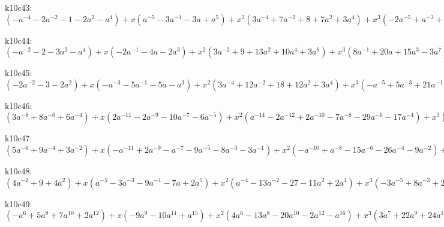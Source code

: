 k10c43: $ (-a^{-4}-2a^{-2}-1-2a^{2}-a^{4}) +x(a^{-5}-3a^{-1}-3a+a^{5}) +x^{2}(3a^{-4}+7a^{-2}+8+7a^{2}+3a^{4}) +x^{3}(-2a^{-5}+a^{-3}+12a^{-1}+12a+a^{3}-2a^{5}) +x^{4}(-6a^{-4}-8a^{-2}-4-8a^{2}-6a^{4}) +x^{5}(a^{-5}-6a^{-3}-16a^{-1}-16a-6a^{3}+a^{5}) +x^{6}(3a^{-4}-6+3a^{4}) +x^{7}(4a^{-3}+7a^{-1}+7a+4a^{3}) +x^{8}(3a^{-2}+6+3a^{2}) +x^{9}(a^{-1}+a) $

k10c44: $ (-a^{-2}-2-3a^{2}-a^{4}) +x(-2a^{-1}-4a-2a^{3}) +x^{2}(3a^{-2}+9+13a^{2}+10a^{4}+3a^{6}) +x^{3}(8a^{-1}+20a+15a^{3}-3a^{7}) +x^{4}(-3a^{-2}-6-12a^{2}-18a^{4}-8a^{6}+a^{8}) +x^{5}(-9a^{-1}-26a-27a^{3}-6a^{5}+4a^{7}) +x^{6}(a^{-2}-4-7a^{2}+5a^{4}+7a^{6}) +x^{7}(3a^{-1}+8a+12a^{3}+7a^{5}) +x^{8}(3+7a^{2}+4a^{4}) +x^{9}(a+a^{3}) $

k10c45: $ (-2a^{-2}-3-2a^{2}) +x(-a^{-3}-5a^{-1}-5a-a^{3}) +x^{2}(3a^{-4}+12a^{-2}+18+12a^{2}+3a^{4}) +x^{3}(-a^{-5}+5a^{-3}+21a^{-1}+21a+5a^{3}-a^{5}) +x^{4}(-7a^{-4}-17a^{-2}-20-17a^{2}-7a^{4}) +x^{5}(a^{-5}-10a^{-3}-31a^{-1}-31a-10a^{3}+a^{5}) +x^{6}(4a^{-4}+3a^{-2}-2+3a^{2}+4a^{4}) +x^{7}(6a^{-3}+14a^{-1}+14a+6a^{3}) +x^{8}(4a^{-2}+8+4a^{2}) +x^{9}(a^{-1}+a) $

k10c46: $ (3a^{-8}+8a^{-6}+6a^{-4}) +x(2a^{-11}-2a^{-9}-10a^{-7}-6a^{-5}) +x^{2}(a^{-14}-2a^{-12}+2a^{-10}-7a^{-8}-29a^{-6}-17a^{-4}) +x^{3}(2a^{-13}-7a^{-11}+9a^{-9}+23a^{-7}+5a^{-5}) +x^{4}(3a^{-12}-9a^{-10}+13a^{-8}+42a^{-6}+17a^{-4}) +x^{5}(4a^{-11}-13a^{-9}-12a^{-7}+5a^{-5}) +x^{6}(4a^{-10}-12a^{-8}-23a^{-6}-7a^{-4}) +x^{7}(4a^{-9}-a^{-7}-5a^{-5}) +x^{8}(3a^{-8}+4a^{-6}+a^{-4}) +x^{9}(a^{-7}+a^{-5}) $

k10c47: $ (5a^{-6}+9a^{-4}+3a^{-2}) +x(-a^{-11}+2a^{-9}-a^{-7}-9a^{-5}-8a^{-3}-3a^{-1}) +x^{2}(-a^{-10}+a^{-8}-15a^{-6}-26a^{-4}-9a^{-2}) +x^{3}(a^{-11}-3a^{-9}+2a^{-7}+19a^{-5}+20a^{-3}+7a^{-1}) +x^{4}(2a^{-10}-3a^{-8}+15a^{-6}+35a^{-4}+15a^{-2}) +x^{5}(3a^{-9}-5a^{-7}-14a^{-5}-11a^{-3}-5a^{-1}) +x^{6}(3a^{-8}-10a^{-6}-23a^{-4}-10a^{-2}) +x^{7}(3a^{-7}+a^{-5}-a^{-3}+a^{-1}) +x^{8}(3a^{-6}+5a^{-4}+2a^{-2}) +x^{9}(a^{-5}+a^{-3}) $

k10c48: $ (4a^{-2}+9+4a^{2}) +x(a^{-5}-3a^{-3}-9a^{-1}-7a+2a^{5}) +x^{2}(a^{-4}-13a^{-2}-27-11a^{2}+2a^{4}) +x^{3}(-3a^{-5}+8a^{-3}+21a^{-1}+12a-a^{3}-3a^{5}) +x^{4}(-5a^{-4}+18a^{-2}+37+9a^{2}-5a^{4}) +x^{5}(a^{-5}-9a^{-3}-11a^{-1}-5a-3a^{3}+a^{5}) +x^{6}(2a^{-4}-11a^{-2}-20-5a^{2}+2a^{4}) +x^{7}(3a^{-3}+a^{-1}+2a^{3}) +x^{8}(3a^{-2}+5+2a^{2}) +x^{9}(a^{-1}+a) $

k10c49: $ (-a^{6}+5a^{8}+7a^{10}+2a^{12}) +x(-9a^{9}-10a^{11}+a^{15}) +x^{2}(4a^{6}-13a^{8}-20a^{10}-2a^{12}-a^{16}) +x^{3}(3a^{7}+22a^{9}+24a^{11}+a^{13}-4a^{15}) +x^{4}(-4a^{6}+15a^{8}+26a^{10}+2a^{12}-4a^{14}+a^{16}) +x^{5}(-6a^{7}-18a^{9}-19a^{11}-4a^{13}+3a^{15}) +x^{6}(a^{6}-11a^{8}-19a^{10}-3a^{12}+4a^{14}) +x^{7}(2a^{7}+3a^{9}+5a^{11}+4a^{13}) +x^{8}(3a^{8}+6a^{10}+3a^{12}) +x^{9}(a^{9}+a^{11}) $

